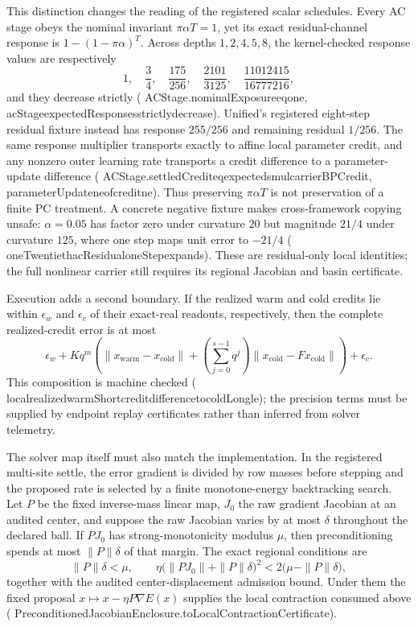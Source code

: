 \documentclass[11pt]{article}
\newcommand{\leanname}[1]{{\scriptsize\ttfamily
  \def\_{\textunderscore\allowbreak}#1}}
\begin{document}
This distinction changes the reading of the registered scalar schedules. Every AC
stage obeys the nominal invariant $\pi\alpha T=1$, yet its exact residual-channel
response is $1-(1-\pi\alpha)^T$. Across depths $1,2,4,5,8$, the kernel-checked
response values are respectively
\[
  1,\quad \frac34,\quad \frac{175}{256},\quad
  \frac{2101}{3125},\quad \frac{11012415}{16777216},
\]
and they decrease strictly
(\leanname{ACStage.nominalExposure\_eq\_one},
\leanname{acStage\_expectedResponses\_strictly\_decrease}). Unified's registered
eight-step residual fixture instead has response $255/256$ and remaining residual
$1/256$. The same response multiplier transports exactly to affine local parameter
credit, and any nonzero outer learning rate transports a credit difference to a
parameter-update difference
(\leanname{ACStage.settledCredit\_eq\_expected\_smul\_carrierBPCredit},
\leanname{parameterUpdate\_ne\_of\_credit\_ne}). Thus preserving
$\pi\alpha T$ is not preservation of a finite PC treatment. A concrete negative
fixture makes cross-framework copying unsafe: $\alpha=0.05$ has factor zero under
curvature $20$ but magnitude $21/4$ under curvature $125$, where one step maps unit
error to $-21/4$
(\leanname{oneTwentieth\_acResidual\_oneStep\_expands}). These are
residual-only local identities; the full nonlinear carrier still requires its
regional Jacobian and basin certificate.

Execution adds a second boundary. If the realized warm and cold credits lie within
$\epsilon_w$ and $\epsilon_c$ of their exact-real readouts, respectively, then the complete
realized-credit error is at most
\[
 \epsilon_w + Kq^m\left(
   \|x_{\mathrm{warm}}-x_{\mathrm{cold}}\|+
   \left(\sum_{j=0}^{s-1}q^j\right)
     \|x_{\mathrm{cold}}-F x_{\mathrm{cold}}\|
 \right)+\epsilon_c.
\]
This composition is machine checked
(\leanname{local\_realized\_warmShort\_credit\_difference\_to\_coldLong\_le}); the
precision terms must be supplied by endpoint replay certificates rather than inferred
from solver telemetry.

The solver map itself must also match the implementation. In the registered multi-site
settle, the error gradient is divided by row masses before stepping and the proposed
rate is selected by a finite monotone-energy backtracking search. Let $P$ be the fixed
inverse-mass linear map, $J_0$ the raw gradient Jacobian at an audited center, and suppose
the raw Jacobian varies by at most $\delta$ throughout the declared ball. If $PJ_0$ has
strong-monotonicity modulus $\mu$, then preconditioning spends at most $\|P\|\delta$ of
that margin. The exact regional conditions are
\[
 \|P\|\delta<\mu,
 \qquad
 \eta\bigl(\|PJ_0\|+\|P\|\delta\bigr)^2
 <2\bigl(\mu-\|P\|\delta\bigr),
\]
together with the audited center-displacement admission bound. Under them the fixed
proposal $x\mapsto x-\eta P\nabla E(x)$ supplies the local contraction consumed above
(\leanname{PreconditionedJacobianEnclosure.\allowbreak{}toLocalContractionCertificate}).
\end{document}
